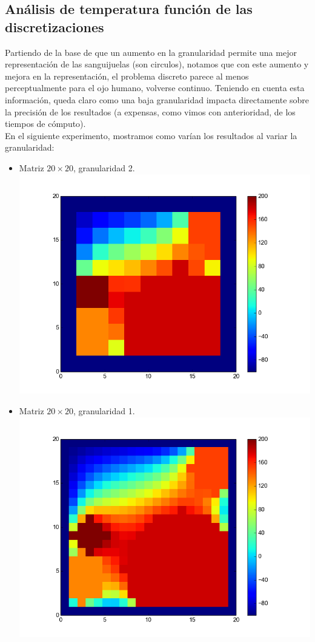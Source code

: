 \subsection{An\'alisis de temperatura funci\'on de las discretizaciones}
Partiendo de la base de que un aumento en la granularidad permite una mejor representaci\'on de las sanguijuelas (son circulos), notamos que con este aumento y mejora en la representaci\'on, el problema discreto parece al menos perceptualmente para el ojo humano, volverse continuo. Teniendo en cuenta esta informaci\'on, queda claro como una baja granularidad impacta directamente sobre la precisi\'on de los resultados (a expensas, como vimos con anterioridad, de los tiempos de c\'omputo).
\\
En el siguiente experimento, mostramos como varían los resultados al variar la granularidad:
\begin{itemize}
 \item Matriz $20 \times 20$, granularidad 2.\\
  \includegraphics[width=400pt]{imagenes/imagen11.png}

 \item Matriz $20 \times 20$, granularidad 1.\\
  \includegraphics[width=400pt]{imagenes/imagen21.png}


\end{itemize}
